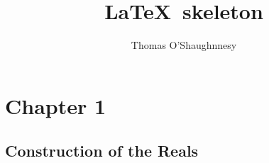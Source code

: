 \documentclass[12pt]{article}
\author{Thomas O'Shaughnnesy}
\title{\LaTeX\ skeleton}
\begin{document}
\maketitle
\section{Chapter 1}
\subsection{Construction of the Reals}
\end{document}
